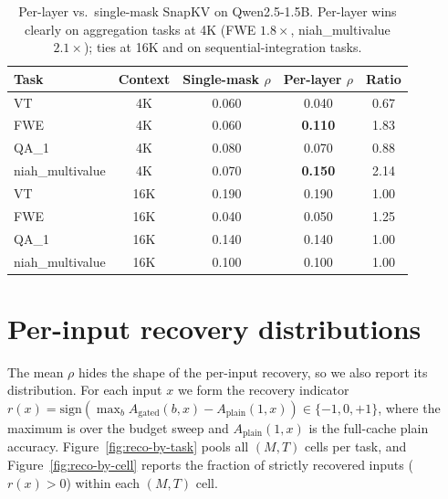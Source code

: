 \begin{table}[h]
\centering
\caption{Per-layer vs.\ single-mask SnapKV on Qwen2.5-1.5B. Per-layer wins
clearly on aggregation tasks at 4K (FWE $1.8\times$, niah\_multivalue
$2.1\times$); ties at 16K and on sequential-integration tasks.}
\label{tab:perlayer}
\begin{tabular}{lcccc}
\toprule
Task & Context & Single-mask $\rho$ & Per-layer $\rho$ & Ratio \\
\midrule
VT               & 4K  & 0.060 & 0.040 & 0.67 \\
FWE              & 4K  & 0.060 & \textbf{0.110} & 1.83 \\
QA\_1            & 4K  & 0.080 & 0.070 & 0.88 \\
niah\_multivalue & 4K  & 0.070 & \textbf{0.150} & 2.14 \\
VT               & 16K & 0.190 & 0.190 & 1.00 \\
FWE              & 16K & 0.040 & 0.050 & 1.25 \\
QA\_1            & 16K & 0.140 & 0.140 & 1.00 \\
niah\_multivalue & 16K & 0.100 & 0.100 & 1.00 \\
\bottomrule
\end{tabular}
\end{table}

\section{Per-input recovery distributions}
\label{app:recovery-hist}

The mean $\rho$ hides the shape of the per-input recovery, so we also
report its distribution. For each input $x$ we form the recovery indicator
$r(x) = \mathrm{sign}\!\left(\max_b A_{\mathrm{gated}}(b, x) - A_{\mathrm{plain}}(1, x)\right)
\in \{-1, 0, +1\}$, where the maximum is over the budget sweep and
$A_{\mathrm{plain}}(1, x)$ is the full-cache plain accuracy. Figure~\ref{fig:reco-by-task}
pools all $(M, T)$ cells per task, and Figure~\ref{fig:reco-by-cell} reports the
fraction of strictly recovered inputs ($r(x) > 0$) within each $(M, T)$ cell.

